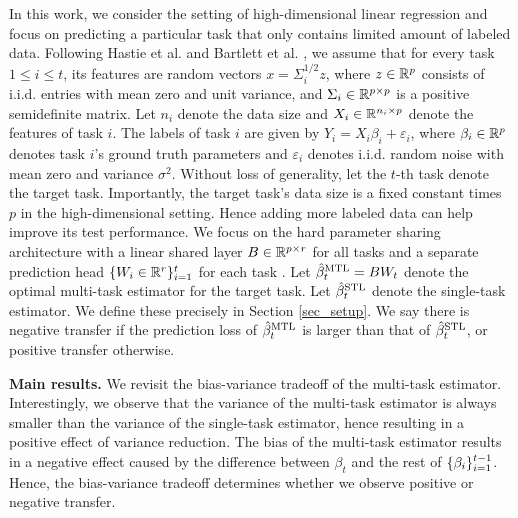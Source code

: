 In this work, we consider the setting of high-dimensional linear regression and focus on predicting a particular task that only contains limited amount of labeled data.
Following Hastie et al. \cite{HMRT19} and Bartlett et al. \cite{BLLT20}, we assume that for every task $1\le i\le t$, its features are random vectors $x = \Sigma_i^{1/2}z$, where $z\in\mathbb{R}^p$ consists of i.i.d. entries with mean zero and unit variance, and $\Sigma_i\in\mathbb{R}^{p\times p}$ is a positive semidefinite matrix.
Let $n_i$ denote the data size and $X_i\in\mathbb{R}^{n_i\times p}$ denote the features of task $i$.
The labels of task $i$ are given by $Y_i = X_i\beta_i + \varepsilon_i$, where $\beta_i\in\mathbb{R}^p$ denotes task $i$'s ground truth parameters and $\varepsilon_i$ denotes i.i.d. random noise with mean zero and variance $\sigma^2$.
Without loss of generality, let the $t$-th task denote the target task.
Importantly, the target task's data size is a fixed constant times $p$ in the high-dimensional setting.
Hence adding more labeled data can help improve its test performance.
We focus on the hard parameter sharing architecture with a linear shared layer $B\in\mathbb{R}^{p\times r}$ for all tasks and a separate prediction head $\{W_i \in \mathbb{R}^{r}\}_{i=1}^t$ for each task \cite{R17,MTDNN19,WZR20}.
Let $\hat{\beta}_t^{\text{MTL}} = B W_t$ denote the optimal multi-task estimator for the target task.
Let $\hat{\beta}_t^{\text{STL}}$ denote the single-task estimator.
We define these precisely in Section \ref{sec_setup}.
We say there is negative transfer if the prediction loss of $\hat{\beta}_t^{\text{MTL}}$  is larger than that of $\hat{\beta}_t^{\text{STL}}$, or positive transfer otherwise.

\textbf{Main results.}
We revisit the bias-variance tradeoff of the multi-task estimator.
Interestingly, we observe that the variance of the multi-task estimator is always smaller than the variance of the single-task estimator, hence resulting in a positive effect of variance reduction.
The bias of the multi-task estimator results in a negative effect caused by the difference between $\beta_t$ and the rest of $\{\beta_i\}_{i=1}^{t-1}$.
Hence, the bias-variance tradeoff determines whether we observe positive or negative transfer.


